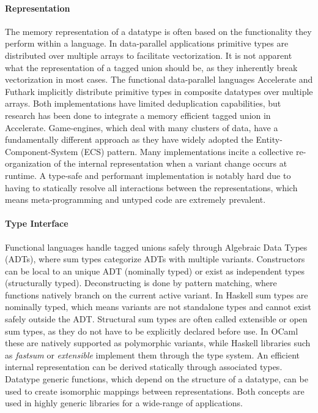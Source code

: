 \documentclass{article}
\begin{document}
\paragraph{Representation}

The memory representation of a datatype is often based on the functionality they perform within a language.
In data-parallel applications primitive types are distributed over multiple arrays to facilitate vectorization.
It is not apparent what the representation of a tagged union should be, as they inherently break vectorization in most cases. 
The functional data-parallel languages Accelerate\cite{accelerate-sum-types} and Futhark\cite{futhark-sum-types} implicitly distribute primitive types in composite datatypes over multiple arrays.
Both implementations have limited deduplication capabilities, but research has been done to integrate a memory efficient tagged union in Accelerate\cite{accelerate-sum-types}.
Game-engines, which deal with many clusters of data, have a fundamentally different approach as they have widely adopted the Entity-Component-System (ECS) pattern. 
Many implementations incite a collective re-organization of the internal representation when a variant change occurs at runtime.
A type-safe and performant implementation is notably hard due to having to statically resolve all interactions between the representations, which means meta-programming and untyped code are extremely prevalent. 

\paragraph{Type Interface}

Functional languages handle tagged unions safely through Algebraic Data Types (ADTs), where sum types categorize ADTs with multiple variants.
Constructors can be local to an unique ADT (nominally typed) or exist as independent types (structurally typed).
Deconstructing is done by pattern matching, where functions natively branch on the current active variant.
In Haskell sum types are nominally typed, which means variants are not standalone types and cannot exist safely outside the ADT.
Structural sum types are often called extensible or open sum types, as they do not have to be explicitly declared before use.
In OCaml these are natively supported as polymorphic variants, while Haskell libraries such as {\it fastsum} or {\it extensible} implement them through the type system.
An efficient internal representation can be derived statically through associated types\cite{associated-types}.
Datatype generic functions, which depend on the structure of a datatype, can be used to create isomorphic mappings between representations.
Both concepts are used in highly generic libraries for a wide-range of applications\cite{generic-programming}. 
\end{document}
